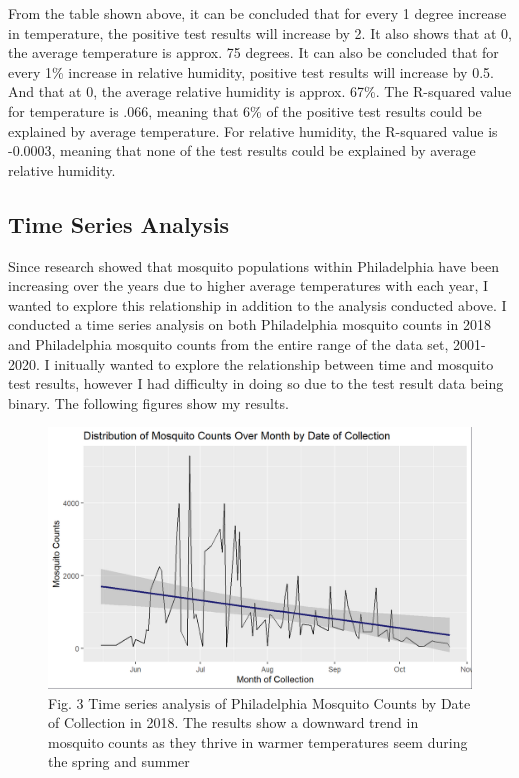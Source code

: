 \documentclass[
  letterpaper,
  DIV=11,
  numbers=noendperiod]{scrartcl}
\begin{document}
From the table shown above, it can be concluded that for every 1 degree
increase in temperature, the positive test results will increase by 2.
It also shows that at 0, the average temperature is approx. 75 degrees.
It can also be concluded that for every 1\% increase in relative
humidity, positive test results will increase by 0.5. And that at 0, the
average relative humidity is approx. 67\%. The R-squared value for
temperature is .066, meaning that 6\% of the positive test results could
be explained by average temperature. For relative humidity, the
R-squared value is -0.0003, meaning that none of the test results could
be explained by average relative humidity.

\hypertarget{time-series-analysis}{%
\subsection{Time Series Analysis}\label{time-series-analysis}}

Since research showed that mosquito populations within Philadelphia have
been increasing over the years due to higher average temperatures with
each year, I wanted to explore this relationship in addition to the
analysis conducted above. I conducted a time series analysis on both
Philadelphia mosquito counts in 2018 and Philadelphia mosquito counts
from the entire range of the data set, 2001-2020. I initually wanted to
explore the relationship between time and mosquito test results, however
I had difficulty in doing so due to the test result data being binary.
The following figures show my results.

\begin{figure}

{\centering \includegraphics[width=8.33333in,height=\textheight]{images/ts_by_day.png}

}

\caption{Fig. 3 Time series analysis of Philadelphia Mosquito Counts by
Date of Collection in 2018. The results show a downward trend in
mosquito counts as they thrive in warmer temperatures seem during the
spring and summer}

\end{figure}
\end{document}
